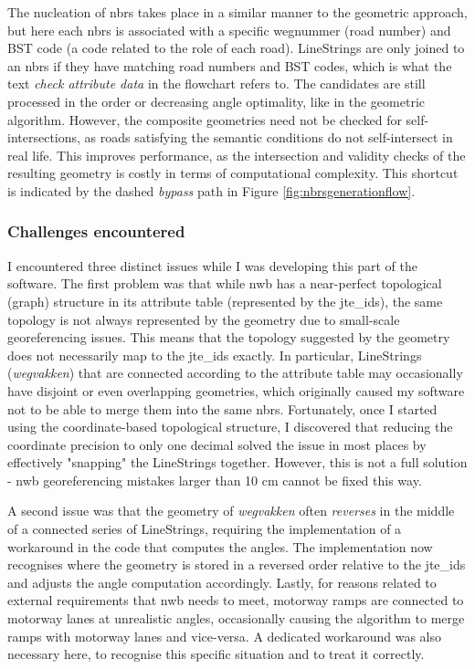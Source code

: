 The nucleation of \ac{nbrs} takes place in a similar manner to the geometric approach, but here each \ac{nbrs} is associated with a specific wegnummer (road number) and BST code (a code related to the role of each road). LineStrings are only joined to an \ac{nbrs} if they have matching road numbers and BST codes, which is what the text \textit{check attribute data} in the flowchart refers to. The candidates are still processed in the order or decreasing angle optimality, like in the geometric algorithm. However, the composite geometries need not be checked for self-intersections, as roads satisfying the semantic conditions do not self-intersect in real life. This improves performance, as the intersection and validity checks of the resulting geometry is costly in terms of computational complexity. This shortcut is indicated by the dashed \textit{bypass} path in Figure \ref{fig:nbrsgenerationflow}.

\subsubsection{Challenges encountered}

I encountered three distinct issues while I was developing this part of the software. The first problem was that while \ac{nwb} has a near-perfect topological (graph) structure in its attribute table (represented by the \ac{jte_id}s), the same topology is not always represented by the geometry due to small-scale georeferencing issues. This means that the topology suggested by the geometry does not necessarily map to the \ac{jte_id}s exactly. In particular, LineStrings (\textit{wegvakken}) that are connected according to the attribute table may occasionally have disjoint or even overlapping geometries, which originally caused my software not to be able to merge them into the same \ac{nbrs}. Fortunately, once I started using the coordinate-based topological structure, I discovered that reducing the coordinate precision to only one decimal solved the issue in most places by effectively "snapping" the LineStrings together. However, this is not a full solution - \ac{nwb} georeferencing mistakes larger than 10 cm cannot be fixed this way.

A second issue was that the geometry of \textit{wegvakken} often \textit{reverses} in the middle of a connected series of LineStrings, requiring the implementation of a workaround in the code that computes the angles. The implementation now recognises where the geometry is stored in a reversed order relative to the \ac{jte_id}s and adjusts the angle computation accordingly. Lastly, for reasons related to external requirements that \ac{nwb} needs to meet, motorway ramps are connected to motorway lanes at unrealistic angles, occasionally causing the algorithm to merge ramps with motorway lanes and vice-versa. A dedicated workaround was also necessary here, to recognise this specific situation and to treat it correctly.

